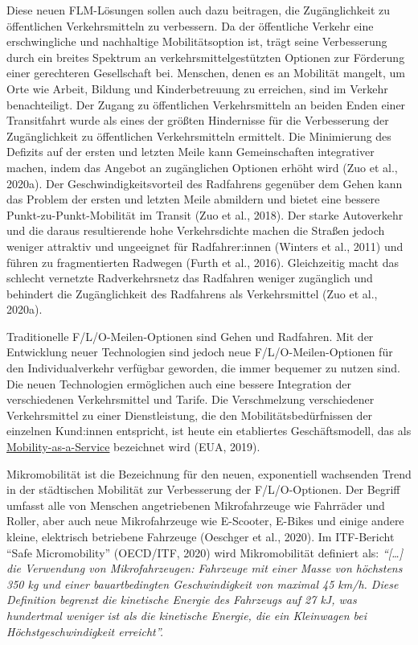 \documentclass[
]{book}
\begin{document}
Diese neuen FLM-Lösungen sollen auch dazu beitragen, die Zugänglichkeit zu öffentlichen Verkehrsmitteln zu verbessern. Da der öffentliche Verkehr eine erschwingliche und nachhaltige Mobilitätsoption ist, trägt seine Verbesserung durch ein breites Spektrum an verkehrsmittelgestützten Optionen zur Förderung einer gerechteren Gesellschaft bei. Menschen, denen es an Mobilität mangelt, um Orte wie Arbeit, Bildung und Kinderbetreuung zu erreichen, sind im Verkehr benachteiligt. Der Zugang zu öffentlichen Verkehrsmitteln an beiden Enden einer Transitfahrt wurde als eines der größten Hindernisse für die Verbesserung der Zugänglichkeit zu öffentlichen Verkehrsmitteln ermittelt. Die Minimierung des Defizits auf der ersten und letzten Meile kann Gemeinschaften integrativer machen, indem das Angebot an zugänglichen Optionen erhöht wird (Zuo et al., 2020a). Der Geschwindigkeitsvorteil des Radfahrens gegenüber dem Gehen kann das Problem der ersten und letzten Meile abmildern und bietet eine bessere Punkt-zu-Punkt-Mobilität im Transit (Zuo et al., 2018). Der starke Autoverkehr und die daraus resultierende hohe Verkehrsdichte machen die Straßen jedoch weniger attraktiv und ungeeignet für Radfahrer:innen (Winters et al., 2011) und führen zu fragmentierten Radwegen (Furth et al., 2016). Gleichzeitig macht das schlecht vernetzte Radverkehrsnetz das Radfahren weniger zugänglich und behindert die Zugänglichkeit des Radfahrens als Verkehrsmittel (Zuo et al., 2020a).

Traditionelle F/L/O-Meilen-Optionen sind Gehen und Radfahren. Mit der Entwicklung neuer Technologien sind jedoch neue F/L/O-Meilen-Optionen für den Individualverkehr verfügbar geworden, die immer bequemer zu nutzen sind. Die neuen Technologien ermöglichen auch eine bessere Integration der verschiedenen Verkehrsmittel und Tarife. Die Verschmelzung verschiedener Verkehrsmittel zu einer Dienstleistung, die den Mobilitätsbedürfnissen der einzelnen Kund:innen entspricht, ist heute ein etabliertes Geschäftsmodell, das als \protect\hyperlink{maas}{Mobility-as-a-Service} bezeichnet wird (EUA, 2019).

Mikromobilität ist die Bezeichnung für den neuen, exponentiell wachsenden Trend in der städtischen Mobilität zur Verbesserung der F/L/O-Optionen. Der Begriff umfasst alle von Menschen angetriebenen Mikrofahrzeuge wie Fahrräder und Roller, aber auch neue Mikrofahrzeuge wie E-Scooter, E-Bikes und einige andere kleine, elektrisch betriebene Fahrzeuge (Oeschger et al., 2020). Im ITF-Bericht ``Safe Micromobility'' (OECD/ITF, 2020) wird Mikromobilität definiert als: \emph{``{[}\ldots{]} die Verwendung von Mikrofahrzeugen: Fahrzeuge mit einer Masse von höchstens 350 kg und einer bauartbedingten Geschwindigkeit von maximal 45 km/h. Diese Definition begrenzt die kinetische Energie des Fahrzeugs auf 27 kJ, was hundertmal weniger ist als die kinetische Energie, die ein Kleinwagen bei Höchstgeschwindigkeit erreicht''.}
\end{document}
